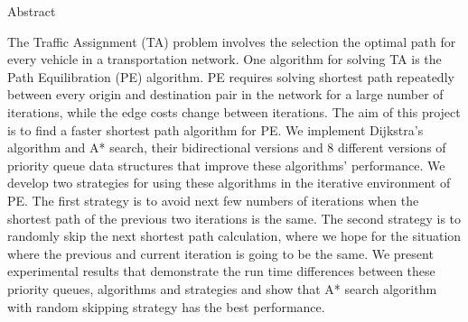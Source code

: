 \begin{center}
\Huge Abstract
\end{center}
\vspace{1cm}
The Traffic Assignment (TA) problem involves the selection the optimal path for every vehicle in a transportation network.
One algorithm for solving TA is the Path Equilibration (PE) algorithm.
PE requires solving shortest path repeatedly between every origin and destination pair in the network for a large number of iterations, while the edge costs change between iterations.
The aim of this project is to find a faster shortest path algorithm for PE.
We implement Dijkstra's algorithm and A* search, their bidirectional versions and 8 different versions of priority queue data structures that improve these algorithms' performance.
We develop two strategies for using these algorithms in the iterative environment of PE.
The first strategy is to avoid next few numbers of iterations when the shortest path of the previous two iterations is the same.
The second strategy is to randomly skip the next shortest path calculation, where we hope for the situation where the previous and current iteration is going to be the same.
We present experimental results that demonstrate the run time differences between these priority queues, algorithms and strategies and show that A* search algorithm with random skipping strategy has the best performance.
